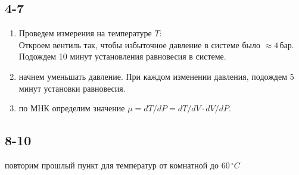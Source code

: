 \subsection*{4-7}
\begin{enumerate}
\item Проведем измерения на температуре $T$:\\
Откроем вентиль так, чтобы избыточное давление в системе было $\approx4\,\text{бар}$. Подождем 10 минут установления равновесия в системе.
\item начнем уменьшать давление. При каждом изменении давления, подождем 5 минут установки равновесия.
\item по МНК определим значение $\mu = dT/dP = dT/dV \cdot dV/dP$.
\end{enumerate}

\subsection*{8-10}
повторим прошлый пункт для температур от комнатной до $60\,^\circ C$

